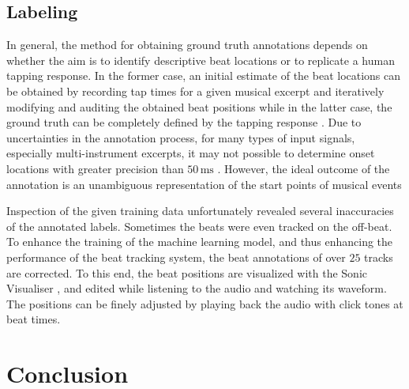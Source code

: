 \documentclass{scrartcl}
\begin{document}


\subsection{Labeling}


In general, the method for obtaining ground truth annotations depends on whether the aim is to identify descriptive beat locations or to replicate a human tapping response. In the former case, an initial estimate of the beat locations can be obtained by recording tap times for a given musical excerpt and iteratively modifying and auditing the obtained beat positions while in the latter case, the ground truth can be completely defined by the tapping response \cite{Davies2009b}.  Due to uncertainties in the annotation process, for many types of input signals, especially multi-instrument excerpts, it may not possible to determine onset locations with greater precision than $50\,\text{ms}$ \cite{Leveau2004}. However, the ideal outcome of the annotation is an unambiguous representation of the start points of musical events

Inspection of the given training data unfortunately revealed several inaccuracies of the annotated labels. Sometimes the beats were even tracked on the off-beat. To enhance the training of the machine learning model, and thus enhancing the performance of the beat tracking system, the beat annotations of over $25$ tracks are corrected. To this end, the beat positions are visualized with the Sonic Visualiser \cite{SonicVisualiser}, and edited while listening to the audio and watching its waveform.
The positions can be finely adjusted by playing back the audio with click tones at beat times.



\newpage 

\section{Conclusion}
\label{sec:conclusion}
\end{document}
